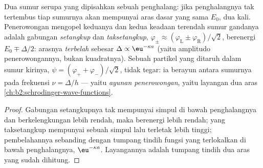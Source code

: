 \begin{proposition}\label{prop:b2:potential-wells-tunneling:double}
Dua sumur serupa yang dipisahkan sebuah penghalang: jika penghalangnya
tak tertembus tiap sumurnya akan mempunyai aras dasar yang sama $E_0$, dua kali.
Penerowongan mengopel keduanya dan kedua keadaan terendah sumur gandanya
adalah gabungan \emph{setangkup} dan \emph{taksetangkup},
$\varphi_\pm \approx (\varphi_{\text{L}} \pm \varphi_{\text{R}})/\sqrt2$, berenergi
$E_0 \mp \Delta/2$: arasnya \emph{terbelah} sebesar $\Delta \propto
\eu^{-\kappa a}$ (yaitu amplitudo penerowongannya, bukan kuadratnya). Sebuah partikel
yang ditaruh dalam sumur kirinya, $\psi = (\varphi_+ + \varphi_-)/\sqrt2$, tidak
tegar: ia berayun antara sumurnya pada frekuensi
$\nu = \Delta/h$ --- yaitu \emph{ayunan penerowongan}, yaitu layangan dua aras
\cref{ch:b2:schrodinger-wave-functions}.
\end{proposition}

\begin{proof}
Gabungan setangkupnya tak mempunyai simpul di bawah penghalangnya dan berkelengkungan
lebih rendah, maka berenergi lebih rendah; yang taksetangkup mempunyai sebuah simpul lalu
terletak lebih tinggi; pembelahannya sebanding dengan tumpang tindih fungsi
yang terlokalkan di bawah penghalangnya, $\eu^{-\kappa a}$. Layangannya adalah
tumpang tindih dua aras yang sudah dihitung.
\end{proof}

